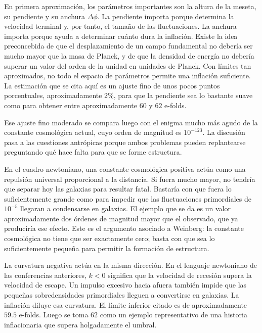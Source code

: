 En primera aproximación, los parámetros importantes son la altura de la meseta, su pendiente y su anchura \(\Delta\phi\). La pendiente importa porque determina la velocidad terminal y, por tanto, el tamaño de las fluctuaciones. La anchura importa porque ayuda a determinar cuánto dura la inflación. Existe la idea preconcebida de que el desplazamiento de un campo fundamental no debería ser mucho mayor que la masa de Planck, y de que la densidad de energía no debería superar un valor del orden de la unidad en unidades de Planck. Con límites tan aproximados, no todo el espacio de parámetros permite una inflación suficiente. La estimación que se cita aquí es un ajuste fino de unos pocos puntos porcentuales, aproximadamente \(2\%\), para que la pendiente sea lo bastante suave como para obtener entre aproximadamente \(60\) y \(62\) e-folds.

\begin{classroomqa}
\end{classroomqa}

Ese ajuste fino moderado se compara luego con el enigma mucho más agudo de la constante cosmológica actual, cuyo orden de magnitud es \(10^{-123}\). La discusión pasa a las cuestiones antrópicas porque ambos problemas pueden replantearse preguntando qué hace falta para que se forme estructura.

En el cuadro newtoniano, una constante cosmológica positiva actúa como una repulsión universal proporcional a la distancia. Si fuera mucho mayor, no tendría que separar hoy las galaxias para resultar fatal. Bastaría con que fuera lo suficientemente grande como para impedir que las fluctuaciones primordiales de \(10^{-5}\) llegaran a condensarse en galaxias. El ejemplo que se da es un valor aproximadamente dos órdenes de magnitud mayor que el observado, que ya produciría ese efecto. Este es el argumento asociado a Weinberg: la constante cosmológica no tiene que ser exactamente cero; basta con que sea lo suficientemente pequeña para permitir la formación de estructura.

La curvatura negativa actúa en la misma dirección. En el lenguaje newtoniano de las conferencias anteriores, \(k<0\) significa que la velocidad de recesión supera la velocidad de escape. Un impulso excesivo hacia afuera también impide que las pequeñas sobredensidades primordiales lleguen a convertirse en galaxias. La inflación diluye esa curvatura. El límite inferior citado es de aproximadamente \(59.5\) e-folds. Luego se toma \(62\) como un ejemplo representativo de una historia inflacionaria que supera holgadamente el umbral.


